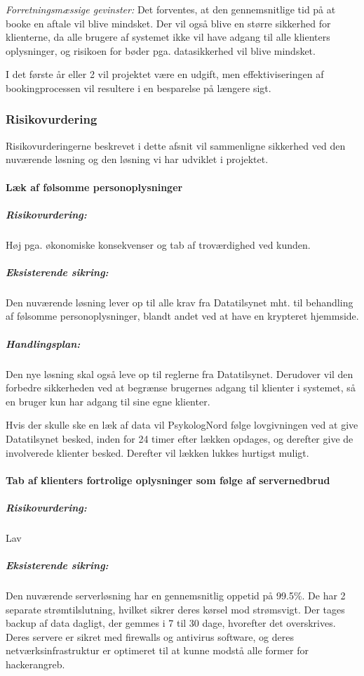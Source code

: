 \textit{Forretningsmæssige gevinster:} Det forventes, at den gennemsnitlige tid på at booke en aftale vil blive mindsket.
Der vil også blive en større sikkerhed for klienterne, da alle brugere af systemet ikke vil have adgang til alle klienters oplysninger, og risikoen for bøder pga. datasikkerhed vil blive mindsket.

I det første år eller 2 vil projektet være en udgift, men effektiviseringen af bookingprocessen vil resultere i en besparelse på længere sigt.

\subsubsection{Risikovurdering}
Risikovurderingerne beskrevet i dette afsnit vil sammenligne sikkerhed ved den nuværende løsning og den løsning vi har udviklet i projektet.

\paragraph*{Læk af følsomme personoplysninger}

\subparagraph{Risikovurdering:}
Høj pga. økonomiske konsekvenser og tab af troværdighed ved kunden.
    
\subparagraph{Eksisterende sikring:}
Den nuværende løsning lever op  til alle krav fra Datatilsynet mht. til behandling af følsomme personoplysninger, blandt andet ved at have en krypteret hjemmside.\cite{terapeutbookingsikkerhed}
    
\subparagraph{Handlingsplan:}
Den nye løsning skal også leve op til reglerne fra Datatilsynet. Derudover vil den forbedre sikkerheden ved at begrænse brugernes adgang til klienter i systemet, så en bruger kun har adgang til sine egne klienter.
    
Hvis der skulle ske en læk af data vil PsykologNord følge lovgivningen ved at give Datatilsynet besked, inden for 24 timer efter lækken opdages, og derefter give de involverede klienter besked. Derefter vil lækken lukkes hurtigst muligt.
    
\paragraph*{Tab af klienters fortrolige oplysninger som følge af servernedbrud}

\subparagraph{Risikovurdering:}
Lav
    
\subparagraph{Eksisterende sikring:}
Den nuværende serverløsning har en gennemsnitlig oppetid på 99.5\%. De har 2 separate strømtilslutning, hvilket sikrer deres kørsel mod strømsvigt. Der tages backup af data dagligt, der gemmes i 7 til 30 dage, hvorefter det overskrives. Deres servere er sikret med firewalls og antivirus software, og deres netværksinfrastruktur er optimeret til at kunne modstå alle former for hackerangreb.\cite{terapeutbookingdata}

